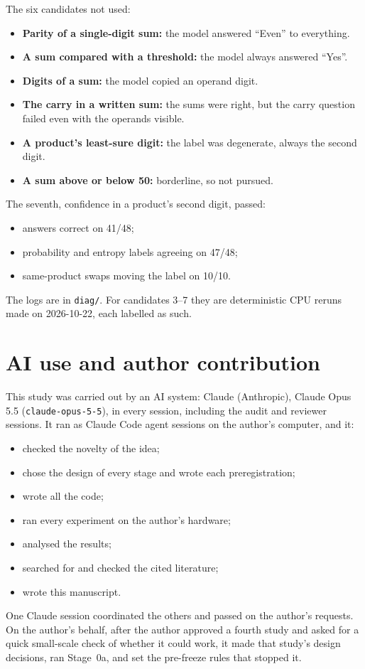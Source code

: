 \documentclass[11pt]{article}
\begin{document}
The six candidates not used:
\begin{itemize}
\item \textbf{Parity of a single-digit sum:} the model answered ``Even'' to everything.
\item \textbf{A sum compared with a threshold:} the model always answered ``Yes''.
\item \textbf{Digits of a sum:} the model copied an operand digit.
\item \textbf{The carry in a written sum:} the sums were right, but the carry question failed even with the operands visible.
\item \textbf{A product's least-sure digit:} the label was degenerate, always the second digit.
\item \textbf{A sum above or below 50:} borderline, so not pursued.
\end{itemize}

The seventh, confidence in a product's second digit, passed:
\begin{itemize}
\item answers correct on 41/48;
\item probability and entropy labels agreeing on 47/48;
\item same-product swaps moving the label on 10/10.
\end{itemize}

The logs are in \texttt{diag/}. For candidates 3--7 they are deterministic CPU reruns made on 2026-10-22, each labelled as such.

\section*{AI use and author contribution}

This study was carried out by an AI system: Claude (Anthropic), Claude Opus 5.5 (\texttt{claude-opus-5-5}), in every session, including the audit and reviewer sessions. It ran as Claude Code agent sessions on the author's computer, and it:
\begin{itemize}
\item checked the novelty of the idea;
\item chose the design of every stage and wrote each preregistration;
\item wrote all the code;
\item ran every experiment on the author's hardware;
\item analysed the results;
\item searched for and checked the cited literature;
\item wrote this manuscript.
\end{itemize}
One Claude session coordinated the others and passed on the author's requests. On the author's behalf, after the author approved a fourth study and asked for a quick small-scale check of whether it could work, it made that study's design decisions, ran Stage~0a, and set the pre-freeze rules that stopped it.
\end{document}
